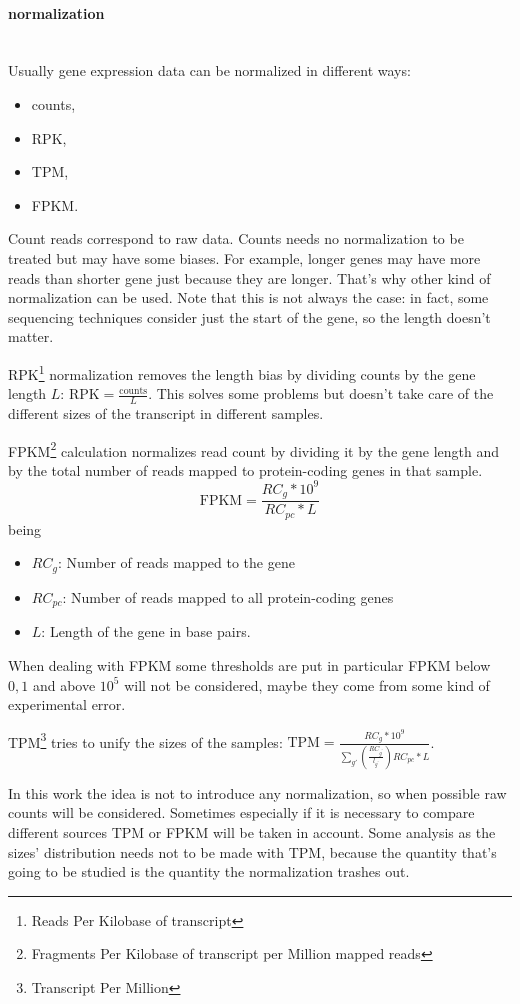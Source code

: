 \paragraph{normalization}\mbox{}\\
Usually gene expression data can be normalized in different ways:
\begin{itemize}
	\item counts,
	\item RPK,
	\item TPM,
	\item FPKM.
\end{itemize}
Count reads correspond to raw data. Counts needs no normalization to be treated but may have some biases. For example, longer genes may have more reads than shorter gene just because they are longer. That's why other kind of normalization can be used. Note that this is not always the case: in fact, some sequencing techniques consider just the start of the gene, so the length doesn't matter.   

RPK\footnote{Reads Per Kilobase of transcript} normalization removes the length bias by dividing counts by the gene length $L$: \(\text{RPK}=\frac{\text{counts}}{L}\). This solves some problems but doesn't take care of the different sizes of the transcript in different samples.

FPKM\footnote{Fragments Per Kilobase of transcript per Million mapped reads} calculation normalizes read count by dividing it by the gene length and by the total number of reads mapped to protein-coding genes in that sample.
\[
\text{FPKM} = \frac{RC_g*10^9}{RC_{pc}*L}
\]
being
\begin{itemize}
	\item $RC_g$: Number of reads mapped to the gene
	\item $RC_{pc}$: Number of reads mapped to all protein-coding genes
	\item $L$: Length of the gene in base pairs.
\end{itemize}
When dealing with FPKM some thresholds are put in particular FPKM below $0,1$ and above $10^5$ will not be considered, maybe they come from some kind of experimental error.

TPM\footnote{Transcript Per Million} tries to unify the sizes of the samples: $\text{TPM} = \frac{RC_g*10^9}{\sum_{g\prime} \left(\frac{RC_{g^\prime}}{l_{g^\prime}}\right) RC_{pc}*L}$.

In this work the idea is not to introduce any normalization, so when possible raw counts will be considered. Sometimes especially if it is necessary to compare different sources TPM or FPKM will be taken in account. Some analysis as the sizes' distribution needs not to be made with TPM, because the quantity that's going to be studied is the quantity the normalization trashes out.

